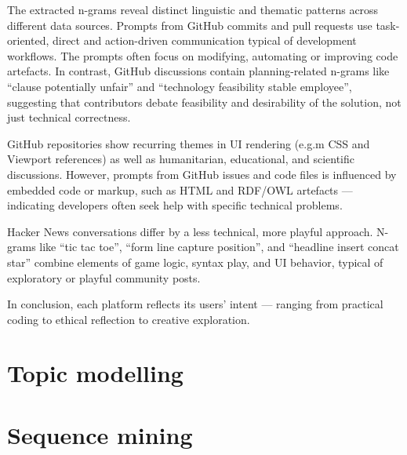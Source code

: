 The extracted n-grams reveal distinct linguistic and thematic patterns across different data sources. Prompts from GitHub commits and pull requests use task-oriented, direct and action-driven communication typical of development workflows. The prompts often focus on modifying, automating or improving code artefacts. In contrast, GitHub discussions contain  planning-related n-grams like ``clause potentially unfair'' and ``technology feasibility stable employee'', suggesting that contributors debate feasibility and desirability of the solution, not just technical correctness. 

GitHub repositories show recurring themes in UI rendering (e.g.m CSS and Viewport references) as well as humanitarian, educational, and scientific discussions. However, prompts from GitHub issues and code files is influenced by embedded code or markup, such as HTML and RDF/OWL artefacts --- indicating developers often seek help with specific technical problems.

Hacker News conversations differ by a less technical, more playful approach. N-grams like ``tic tac toe'', ``form line capture position'', and ``headline insert concat star'' combine elements of game logic, syntax play, and UI behavior, typical of exploratory or playful community posts.

In conclusion, each platform reflects its users' intent --- ranging from practical coding to ethical reflection to creative exploration.

\section{Topic modelling}

\section{Sequence mining}